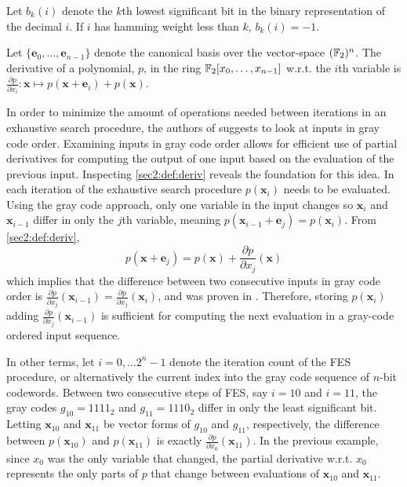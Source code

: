 \begin{defn}[] \label{sec2:def:bk}
    Let $b_k(i)$ denote the $k$th lowest significant bit
in the binary representation of the decimal $i$. If $i$ has hamming weight less than $k$, $b_k(i) = -1$.
\end{defn}

\begin{defn}[Derivatives] \label{sec2:def:deriv}
    Let $\{\mathbf{e}_0, \dots, \mathbf{e}_{n-1}\}$ denote the canonical basis over the vector-space $(\mathbb{F}_2)^n$. The derivative of a polynomial, $p$, in the ring $\mathbb{F}_2[x_0,\dots,x_{n-1}]$ w.r.t. the $i$th variable is $\frac{\partial p}{\partial x_i} : \mathbf{x} \mapsto p(\mathbf{x} + \mathbf{e}_i) + p(\mathbf{x})$.
\end{defn} 

In order to minimize the amount of operations needed between iterations in an exhaustive search procedure, the authors of \cite{cryptoeprint:2010/313} suggests to look at inputs in gray code order.
Examining inputs in gray code order allows for efficient use of partial derivatives for computing the output of one input based on the evaluation of the previous input. Inspecting \cref{sec2:def:deriv} reveals the foundation for this idea. In each iteration of the exhaustive search procedure $p(\mathbf{x}_i)$ needs to be evaluated. Using the gray code approach, only one variable in the input changes so $\mathbf{x}_i$ and $\mathbf{x}_{i - 1}$ differ in only the $j$th variable, meaning $p(\mathbf{x}_{i - 1} + \mathbf{e}_j) = p(\mathbf{x}_i)$. From \cref{sec2:def:deriv}, $$
    p(\mathbf{x} + \mathbf{e}_j) = p(\mathbf{x}) + \frac{\partial p}{\partial x_j}(\mathbf{x})
$$ 
which implies that the difference between two consecutive inputs in gray code order is $\frac{\partial p}{\partial x_j}(\mathbf{x}_{i - 1}) = \frac{\partial p}{\partial x_j}(\mathbf{x}_i)$, and was proven in \cite{tungchoumasters}. Therefore, storing $p(\mathbf{x}_i)$ adding $\frac{\partial p}{\partial x_j}(\mathbf{x}_{i-1})$ is sufficient for computing the next evaluation in a gray-code ordered input sequence.

In other terms, let $i = 0,\dots 2^n-1$ denote the iteration count of the FES procedure, or alternatively the current index into the gray code sequence of $n$-bit codewords. Between two consecutive steps of FES, say $i = 10$ and $i = 11$, the gray codes $g_{10} = 1111_2$ and $g_{11} = 1110_2$ differ in only the least significant bit. Letting $\mathbf{x}_{10}$ and $\mathbf{x}_{11}$ be vector forms of $g_{10}$ and $g_{11}$, respectively, the difference between $p(\mathbf{x}_{10})$ and $p(\mathbf{x}_{11})$ is exactly $\frac{\partial p}{\partial x_0}(\mathbf{x}_{11})$. In the previous example, since $x_0$ was the only variable that changed, the partial derivative w.r.t. $x_0$ represents the only parts of $p$ that change between evaluations of $\mathbf{x}_{10}$ and $\mathbf{x}_{11}$.

